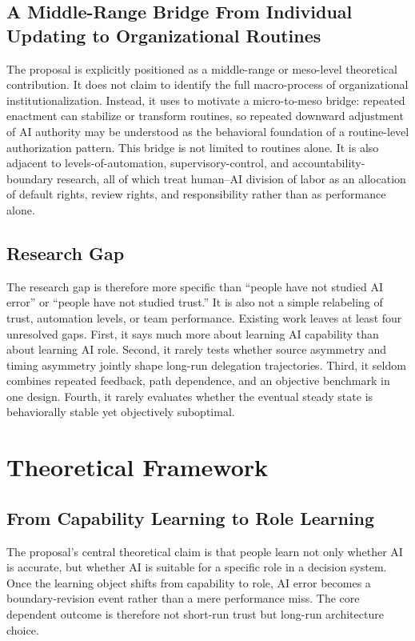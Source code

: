 \documentclass[man,natbib]{apa7}
\begin{document}
\subsection{A Middle-Range Bridge From Individual Updating to Organizational Routines}

The proposal is explicitly positioned as a middle-range or meso-level theoretical contribution. It does not claim to identify the full macro-process of organizational institutionalization. Instead, it uses \citet{feldman2003routines} to motivate a micro-to-meso bridge: repeated enactment can stabilize or transform routines, so repeated downward adjustment of AI authority may be understood as the behavioral foundation of a routine-level authorization pattern. This bridge is not limited to routines alone. It is also adjacent to levels-of-automation, supervisory-control, and accountability-boundary research, all of which treat human--AI division of labor as an allocation of default rights, review rights, and responsibility rather than as performance alone.

\subsection{Research Gap}

The research gap is therefore more specific than ``people have not studied AI error'' or ``people have not studied trust.'' It is also not a simple relabeling of trust, automation levels, or team performance. Existing work leaves at least four unresolved gaps. First, it says much more about learning AI capability than about learning AI role. Second, it rarely tests whether source asymmetry and timing asymmetry jointly shape long-run delegation trajectories. Third, it seldom combines repeated feedback, path dependence, and an objective benchmark in one design. Fourth, it rarely evaluates whether the eventual steady state is behaviorally stable yet objectively suboptimal.

\section{Theoretical Framework}

\subsection{From Capability Learning to Role Learning}

The proposal's central theoretical claim is that people learn not only whether AI is accurate, but whether AI is suitable for a specific role in a decision system. Once the learning object shifts from capability to role, AI error becomes a boundary-revision event rather than a mere performance miss. The core dependent outcome is therefore not short-run trust but long-run architecture choice.
\end{document}
